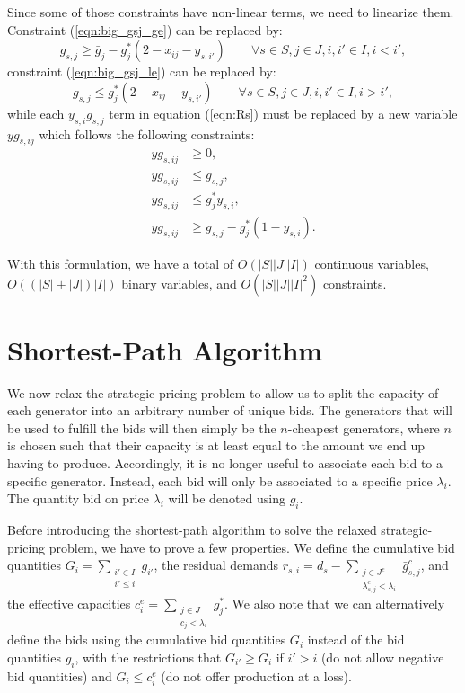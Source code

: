 \documentclass[12pt]{article}
\begin{document}
Since some of those constraints have non-linear terms, we need to linearize
them. Constraint (\ref{eqn:big_gsj_ge}) can be replaced by:
\begin{equation}
g_{s,j} \ge \bar{g}_j - g^*_j (2 - x_{ij} - y_{s,i'}) \qquad \forall s \in S, j \in J, i, i' \in I, i < i',
\end{equation}
constraint (\ref{eqn:big_gsj_le}) can be replaced by:
\begin{equation}
g_{s,j} \le g^*_j (2 - x_{ij} - y_{s,i'}) \qquad \forall s \in S, j \in J, i, i' \in I, i > i',
\end{equation}
while each $y_{s,i} g_{s,j}$ term in equation (\ref{eqn:Rs})
must be replaced by a new variable $yg_{s,ij}$ which follows the following
constraints:
\begin{align}
yg_{s,ij} &\ge 0, \\
yg_{s,ij} &\le g_{s,j}, \\
yg_{s,ij} &\le g^*_j y_{s,i}, \\
yg_{s,ij} &\ge g_{s,j} - g^*_j (1 - y_{s,i}).
\end{align}

With this formulation, we have a total of $O\left( |S| |J| |I| \right)$
continuous variables, $O\left( (|S| + |J|) |I| \right)$ binary variables, and
$O\left( |S| |J| |I|^2 \right)$ constraints.



\section{Shortest-Path Algorithm}

We now relax the strategic-pricing problem to allow us to split the capacity
of each generator into an arbitrary number of unique bids. The generators
that will be used to fulfill the bids will then simply be the $n$-cheapest
generators, where $n$ is chosen such that their capacity is at least equal
to the amount we end up having to produce. Accordingly, it is no longer
useful to associate each bid to a specific generator. Instead, each bid
will only be associated to a specific price $\lambda_i$. The quantity bid
on price $\lambda_i$ will be denoted using $g_i$.

Before introducing the shortest-path algorithm to solve the relaxed
strategic-pricing problem, we have to prove a few properties.
We define the cumulative bid quantities $G_i = \sum_{\substack{i' \in I\\i'
\le i}} g_{i'}$, the residual demands $r_{s,i} = d_s - \sum_{\substack{j \in
J^c\\ \lambda^c_{s,j} < \lambda_i}} \bar{g}^c_{s,j}$, and the effective capacities
$c^e_i = \sum_{\substack{j \in J\\c_j < \lambda_i}} g^*_j$.
We also note that we can alternatively define the bids using the
cumulative bid quantities $G_i$ instead of the bid quantities $g_i$, with
the restrictions that $G_{i'} \ge G_i$ if $i'>i$ (do not allow negative bid
quantities) and $G_i \le c^e_i$ (do not offer production at a loss).
\end{document}
